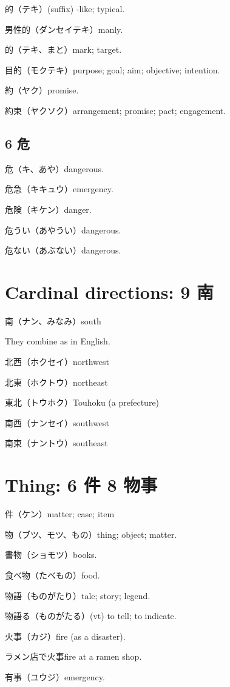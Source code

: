 的（テキ）(suffix) -like; typical.

男性的（ダンセイテキ）manly.

的（テキ、まと）mark; target.

目的（モクテキ）purpose; goal; aim; objective; intention.

約（ヤク）promise.

約束（ヤクソク）arrangement; promise; pact; engagement.

\subsection{6 危}

危（キ、あや）dangerous.

危急（キキュウ）emergency.

危険（キケン）danger.

危うい（あやうい）dangerous.

危ない（あぶない）dangerous.

\section{Cardinal directions: 9 南}

南（ナン、みなみ）south

They combine as in English.

北西（ホクセイ）northwest

北東（ホクトウ）northeast

東北（トウホク）Touhoku (a prefecture)

南西（ナンセイ）southwest

南東（ナントウ）southeast

\section{Thing: 6 件 8 物事}

件（ケン）matter; case; item

物（ブツ、モツ、もの）thing; object; matter.

書物（ショモツ）books.

食べ物（たべもの）food.

物語（ものがたり）tale; story; legend.

物語る（ものがたる）(vt) to tell; to indicate.

火事（カジ）fire (as a disaster).

ラメン店で火事fire at a ramen shop.

有事（ユウジ）emergency.


